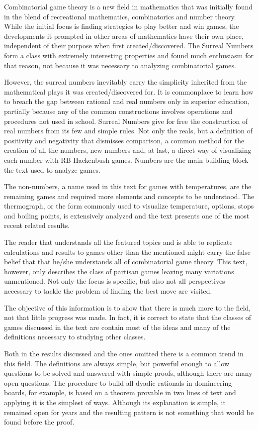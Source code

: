 Combinatorial game theory is a new field in mathematics that was initially found in the blend of recreational mathematics, combinatorics and number theory. While the initial focus is finding strategies to play better and win games, the developments it prompted in other areas of mathematics have their own place, independent of their purpose when first created/discovered. The Surreal Numbers form a class with extremely interesting properties and found much enthusiasm for that reason, not because it was necessary to analyzing combinatorial games.

However, the surreal numbers inevitably carry the simplicity inherited from the mathematical plays it was created/discovered for. It is commonplace to learn how to breach the gap between rational and real numbers only in superior education, partially because any of the common constructions involves operations and procedures not used in school. Surreal Numbers give for free the construction of real numbers from its few and simple rules. Not only the reals, but a definition of positivity and negativity that dismisses comparison, a common method for the creation of all the numbers, new numbers and, at last, a direct way of visualizing each number with RB-Hackenbush games. Numbers are the main building block the text used to analyze games.

The non-numbers, a name used in this text for games with temperatures, are the remaining games and required more elements and concepts to be understood. The thermograph, or the form commonly used to visualize temperature, options, stops and boiling points, is extensively analyzed and the text presents one of the most recent related results.

The reader that understands all the featured topics and is able to replicate calculations and results to games other than the mentioned might carry the false belief that that he/she understands all of combinatorial game theory. This text, however, only describes the class of partisan games leaving many variations unmentioned. Not only the focus is specific, but also not all perspectives necessary to tackle the problem of finding the best move are visited.

The objective of this information is to show that there is much more to the field, not that little progress was made. In fact, it is correct to state that the classes of games discussed in the text are contain most of the ideas and many of the definitions necessary to studying other classes.

Both in the results discussed and the ones omitted there is a common trend in this field. The definitions are always simple, but powerful enough to allow questions to be solved and answered with simple proofs, although there are many open questions. The procedure to build all dyadic rationals in domineering boards, for example, is based on a theorem provable in two lines of text and applying it is the simplest of ways. Although its explanation is simple, it remained open for years and the resulting pattern is not something that would be found before the proof.

